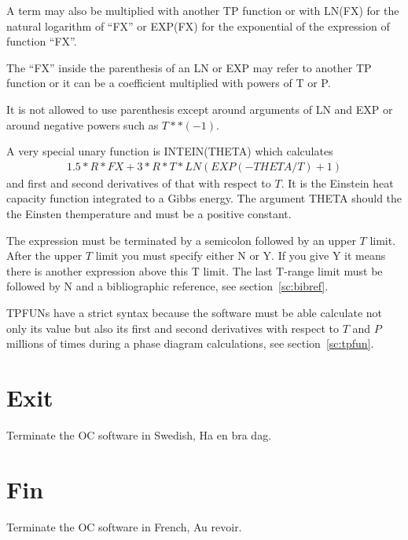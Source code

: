 \documentclass[11pt]{article}
\begin{document}
A term may also be multiplied with another TP function or with LN(FX)
for the natural logarithm of ``FX'' or EXP(FX) for the exponential of
the expression of function ``FX''.

The ``FX'' inside the parenthesis of an LN or EXP may refer to another
TP function or it can be a coefficient multiplied with powers of T or
P.

It is not allowed to use parenthesis except around arguments of LN and
EXP or around negative powers such as $T**(-1)$.

A very special unary function is INTEIN(THETA) which calculates
\begin{eqnarray}
1.5*R*FX + 3*R*T*LN(EXP(-THETA/T) + 1) 
\end{eqnarray}
and first and second derivatives of that with respect to $T$.  It is
the Einstein heat capacity function integrated to a Gibbs energy.  The
argument THETA should the the Einsten themperature and must be a
positive constant.

The expression must be terminated by a semicolon followed by an upper
$T$ limit.  After the upper $T$ limit you must specify either N or Y.
If you give Y it means there is another expression above this T limit.
The last T-range limit must be followed by N and a bibliographic
reference, see section~\ref{sc:bibref}.

TPFUNs have a strict syntax because the software must be able
calculate not only its value but also its first and second derivatives
with respect to $T$ and $P$ millions of times during a phase diagram
calculations, see section~\ref{sc:tpfun}.

\hypertarget{Exit}{}
\section{Exit}

Terminate the OC software in Swedish, Ha en bra dag.

\hypertarget{Fin}{}
\section{Fin}

Terminate the OC software in French, Au revoir.

\hypertarget{Help}{}
\hypertarget{Help for which *}{}
\end{document}
